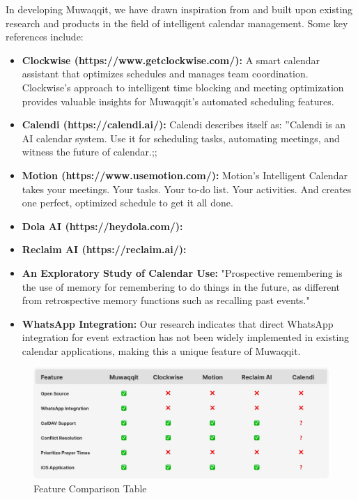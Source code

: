 \documentclass[12pt,a4paper]{article}
\begin{document}
In developing Muwaqqit, we have drawn inspiration from and built upon existing research and products in the field of intelligent calendar management. Some key references include:

\begin{itemize}
    \item \textbf{Clockwise (https://www.getclockwise.com/):} A smart calendar assistant that optimizes schedules and manages team coordination. Clockwise's approach to intelligent time blocking and meeting optimization provides valuable insights for Muwaqqit's automated scheduling features.
    \item \textbf{Calendi (https://calendi.ai/):} Calendi describes itself as: ''Calendi is an AI calendar system. Use it for scheduling tasks, automating meetings, and witness the future of calendar.;;
    \item \textbf{Motion (https://www.usemotion.com/):} Motion’s Intelligent Calendar takes your meetings. Your tasks. Your to-do list. Your activities. And creates one perfect, optimized schedule to get it all done.
    \item \textbf{Dola AI (https://heydola.com/):}
    \item \textbf{Reclaim AI (https://reclaim.ai/):}
    \item \textbf{An Exploratory Study of Calendar Use:} "Prospective remembering is the use of memory for remembering to do things in the future, as different from retrospective memory functions such as recalling past events." \cite{tungare2008exploratorystudycalendaruse}
    \item \textbf{WhatsApp Integration:} Our research indicates that direct WhatsApp integration for event extraction has not been widely implemented in existing calendar applications, making this a unique feature of Muwaqqit.
\end{itemize}

\begin{figure}[!h]
    \centering
    \includegraphics[width=\textwidth]{images/features-table.png}
    \caption{Feature Comparison Table}
    \label{fig:features-table}
\end{figure}
\end{document}
